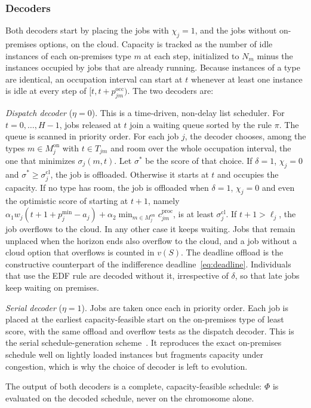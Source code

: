 \documentclass[conference]{IEEEtran}
\begin{document}
\subsubsection{Decoders}
Both decoders start by placing the jobs with $\chi_j=1$, and the jobs without on-premises options, on the cloud. Capacity is tracked as the number of idle instances of each on-premises type $m$ at each step, initialized to $N_m$ minus the instances occupied by jobs that are already running. Because instances of a type are identical, an occupation interval can start at $t$ whenever at least one instance is idle at every step of $[t,t+p_{jm}^{\mathrm{occ}})$. The two decoders are:

\emph{Dispatch decoder} ($\eta=0$). This is a time-driven, non-delay list scheduler. For $t=0,\ldots,H-1$, jobs released at $t$ join a waiting queue sorted by the rule $\pi$. The queue is scanned in priority order. For each job $j$, the decoder chooses, among the types $m\in M_j^{\mathrm{on}}$ with $t\in T_{jm}$ and room over the whole occupation interval, the one that minimizes $\sigma_j(m,t)$. Let $\sigma^\ast$ be the score of that choice. If $\delta=1$, $\chi_j=0$ and $\sigma^\ast\geq\sigma_j^{\mathrm{cl}}$, the job is offloaded. Otherwise it starts at $t$ and occupies the capacity. If no type has room, the job is offloaded when $\delta=1$, $\chi_j=0$ and even the optimistic score of starting at $t+1$, namely $\alpha_1w_j(t+1+p_j^{\min}-a_j)+\alpha_2\min_{m\in M_j^{\mathrm{on}}}c_{jm}^{\mathrm{proc}}$, is at least $\sigma_j^{\mathrm{cl}}$. If $t+1>\ell_j$, the job overflows to the cloud. In any other case it keeps waiting. Jobs that remain unplaced when the horizon ends also overflow to the cloud, and a job without a cloud option that overflows is counted in $v(S)$. The deadline offload is the constructive counterpart of the indifference deadline~\eqref{eq:deadline}. Individuals that use the EDF rule are decoded without it, irrespective of $\delta$, so that late jobs keep waiting on premises.

\emph{Serial decoder} ($\eta=1$). Jobs are taken once each in priority order. Each job is placed at the earliest capacity-feasible start on the on-premises type of least score, with the same offload and overflow tests as the dispatch decoder. This is the serial schedule-generation scheme~\cite{Kolisch1996}. It reproduces the exact on-premises schedule well on lightly loaded instances but fragments capacity under congestion, which is why the choice of decoder is left to evolution.

The output of both decoders is a complete, capacity-feasible schedule: $\Phi$ is evaluated on the decoded schedule, never on the chromosome alone.
\end{document}
